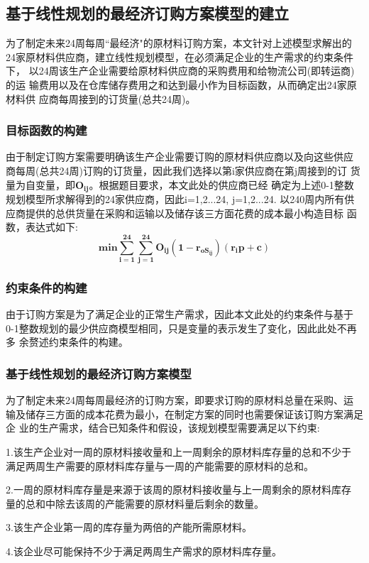 \documentclass[UTF8]{ctexart}
\begin{document}
\subsection{基于线性规划的最经济订购方案模型的建立}
为了制定未来24周每周“最经济"的原材料订购方案，本文针对上述模型求解出的
24家原材料供应商，建立线性规划模型，在必须满足企业的生产需求的约束条件下，
以24周该生产企业需要给原材料供应商的采购费用和给物流公司(即转运商)的运
输费用以及在仓库储存费用之和达到最小作为目标函数，从而确定出24家原材料供
应商每周接到的订货量(总共24周)。
\subsubsection{目标函数的构建}
由于制定订购方案需要明确该生产企业需要订购的原材料供应商以及向这些供应
商每周(总共24周)订购的订货量，因此我们选择以第i家供应商在第j周接到的订
货量为自变量，即$\mathbf{O_{ij}}$。根据题目要求，本文此处的供应商已经
确定为上述0-1整数规划模型所求解得到的24家供应商，因此i=1,2...24, j=1,2...24. 
以240周内所有供应商提供的总供货量在采购和运输以及储存该三方面花费的成本最小构造目标
函数，表达式如下:
\begin{equation}
	\mathbf{min\sum_{i=1}^{24} \sum_{j=1}^{24}O_{ij}(1-r_{oS_{ij}})(r_{i}p+c)}
\end{equation}
\subsubsection{约束条件的构建}
由于订购方案是为了满足企业的正常生产需求，因此本文此处的约束条件与基于
0-1整数规划的最少供应商模型相同，只是变量的表示发生了变化，因此此处不再多
余赘述约束条件的构建。
\subsubsection{基于线性规划的最经济订购方案模型}
为了制定未来24周每周最经济的订购方案，即要求订购的原材料总量在采购、运
输及储存三方面的成本花费为最小，在制定方案的同时也需要保证该订购方案满足企
业的生产需求，结合已知条件和假设，该规划模型需要满足以下约束:

1.该生产企业对一周的原材料接收量和上一周剩余的原材料库存量的总和不少于
满足两周生产需要的原材料库存量与一周的产能需要的原材料的总和。

2.一周的原材料库存量是来源于该周的原材料接收量与上一周剩余的原材料库存
量的总和中除去该周的产能需要的原材料量后剩余的数量。

3.该生产企业第一周的库存量为两倍的产能所需原材料。

4.该企业尽可能保持不少于满足两周生产需求的原材料库存量。
\end{document}

